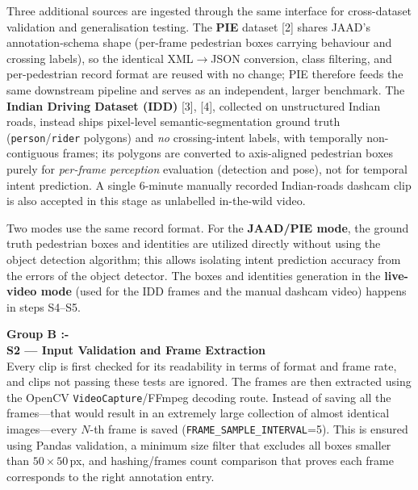 \documentclass[conference]{IEEEtran}
\begin{document}
Three additional sources are ingested through the same interface for cross-dataset validation and generalisation testing. The \textbf{PIE} dataset [2] shares JAAD's annotation-schema shape (per-frame pedestrian boxes carrying behaviour and crossing labels), so the identical XML$\rightarrow$JSON conversion, class filtering, and per-pedestrian record format are reused with no change; PIE therefore feeds the same downstream pipeline and serves as an independent, larger benchmark. The \textbf{Indian Driving Dataset (IDD)} [3], [4], collected on unstructured Indian roads, instead ships pixel-level semantic-segmentation ground truth (\texttt{person}/\texttt{rider} polygons) and \emph{no} crossing-intent labels, with temporally non-contiguous frames; its polygons are converted to axis-aligned pedestrian boxes purely for \emph{per-frame perception} evaluation (detection and pose), not for temporal intent prediction. A single 6-minute manually recorded Indian-roads dashcam clip is also accepted in this stage as unlabelled in-the-wild video.

Two modes use the same record format. For the \textbf{JAAD/PIE mode}, the ground truth pedestrian boxes and identities are utilized directly without using the object detection algorithm; this allows isolating intent prediction accuracy from the errors of the object detector. The boxes and identities generation in the \textbf{live-video mode} (used for the IDD frames and the manual dashcam video) happens in steps S4--S5.

\vspace{8pt}
\noindent\textbf{Group B :- }
\mbox{}\\
\textbf{S2 --- Input Validation and Frame Extraction} \\
Every clip is first checked for its readability in terms of format and frame rate, and clips not passing these tests are ignored. The frames are then extracted using the OpenCV \texttt{VideoCapture}/FFmpeg decoding route. Instead of saving all the frames---that would result in an extremely large collection of almost identical images---every $N$-th frame is saved (\texttt{FRAME\_SAMPLE\_INTERVAL}=5). This is ensured using Pandas validation, a minimum size filter that excludes all boxes smaller than $50 \times 50$\,px, and hashing/frames count comparison that proves each frame corresponds to the right annotation entry.
\end{document}
